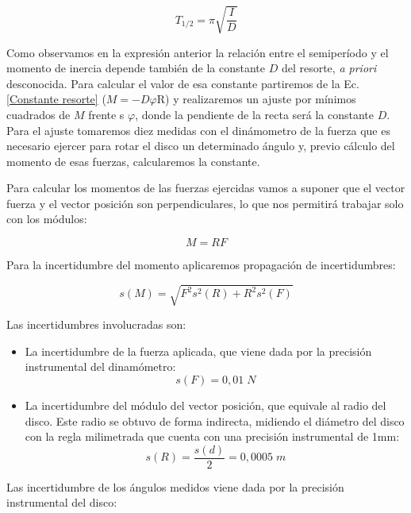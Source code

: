 \documentclass[a4paper,12pt,titlepage]{report}
\begin{document}
\begin{equation}
    T_{1/2} = \pi \sqrt{\frac{I}{D}}
    \label{SemiT osc}
\end{equation}

Como observamos en la expresión anterior la relación entre el semiperíodo y el momento de inercia depende también de la constante $D$ del resorte, \textit{a priori} desconocida. Para calcular el valor de esa constante partiremos de la Ec.\ref{Constante resorte} ($M=-D\varphi$R) y realizaremos un ajuste por mínimos cuadrados de $M$ frente s $\varphi$, donde la pendiente de la recta será la constante $D$. Para el ajuste tomaremos diez medidas con el dinámometro de la fuerza que es necesario ejercer para rotar el disco un determinado ángulo y, previo cálculo del momento de esas fuerzas, calcularemos la constante.

\par Para calcular los momentos de las fuerzas ejercidas vamos a suponer que el vector fuerza y el vector posición son perpendiculares, lo que nos permitirá trabajar solo con los módulos:

\begin{equation}
    M=RF
\end{equation}

Para la incertidumbre del momento aplicaremos propagación de incertidumbres:

\begin{equation}
    s(M) = \sqrt{F^2s^2(R)+R^2s^2(F)}
\end{equation}

Las incertidumbres involucradas son:

\begin{itemize}
    \item La incertidumbre de la fuerza aplicada, que viene dada por la precisión instrumental del dinamómetro:
    \begin{equation}
        s(F) = 0,01 \; N
    \end{equation}
    \item La incertidumbre del módulo del vector posición, que equivale al radio del disco. Este radio se obtuvo de forma indirecta, midiendo el diámetro del disco con la regla milimetrada que cuenta con una precisión instrumental de 1mm:
    \begin{equation}
        s(R) = \frac{s(d)}{2} = 0,0005 \; m
    \end{equation}
\end{itemize}

Las incertidumbre de los ángulos medidos viene dada por la precisión instrumental del disco:
\end{document}
